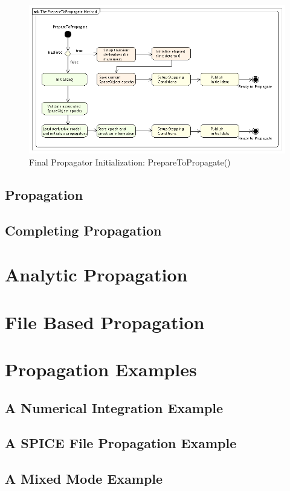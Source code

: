 \begin{figure}[htb]
\begin{center}
\includegraphics[396,230]{Images/ThePrepareToPropagateMethod.png}
\caption[Final Propagator Initialization:PrepareToPropagate())]
{\label{figure:PrepareToPropagate}Final Propagator Initialization:
PrepareToPropagate()}
\end{center}
\end{figure}


\subsection{Propagation}



\subsection{Completing Propagation}


\section{Analytic Propagation}

\section{File Based Propagation}

\section{Propagation Examples}

\subsection{\label{section:IntegratorExample}A Numerical Integration Example}

\subsection{\label{section:SpiceExample}A SPICE File Propagation Example}

\subsection{\label{section:MixedModePropagation}A Mixed Mode Example}

